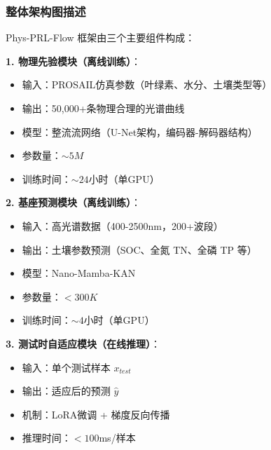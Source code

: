 \documentclass[12pt, a4paper]{article}
\begin{document}
\subsubsection{整体架构图描述}
Phys-PRL-Flow 框架由三个主要组件构成：

\textbf{1. 物理先验模块（离线训练）}：
\begin{itemize}
    \item 输入：PROSAIL仿真参数（叶绿素、水分、土壤类型等）
    \item 输出：50,000+条物理合理的光谱曲线
    \item 模型：整流流网络（U-Net架构，编码器-解码器结构）
    \item 参数量：$\sim 5M$
    \item 训练时间：$\sim 24$小时（单GPU）
\end{itemize}

\textbf{2. 基座预测模块（离线训练）}：
\begin{itemize}
    \item 输入：高光谱数据（400-2500nm，200+波段）
    \item 输出：土壤参数预测（SOC、全氮 TN、全磷 TP 等）
    \item 模型：Nano-Mamba-KAN
    \item 参数量：$<300K$
    \item 训练时间：$\sim 4$小时（单GPU）
\end{itemize}

\textbf{3. 测试时自适应模块（在线推理）}：
\begin{itemize}
    \item 输入：单个测试样本 $x_{test}$
    \item 输出：适应后的预测 $\hat{y}$
    \item 机制：LoRA微调 + 梯度反向传播
    \item 推理时间：$<100$ms/样本
\end{itemize}
\end{document}
